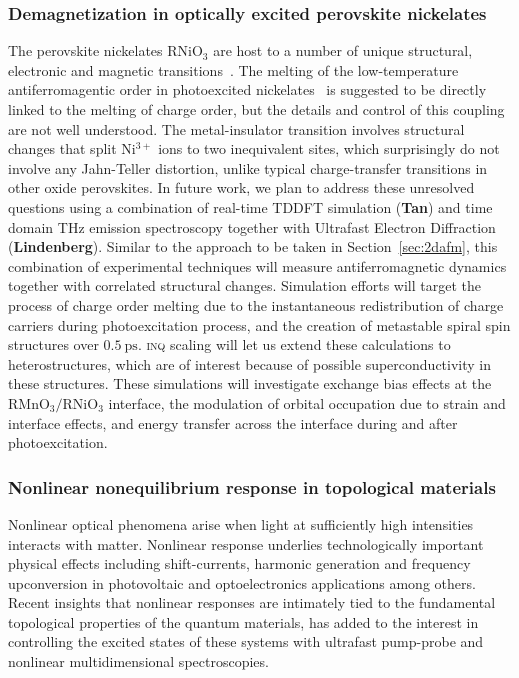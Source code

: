 \subsubsection{Demagnetization in optically excited perovskite nickelates}

The perovskite nickelates \(\mathrm{RNiO_3}\) are host to a number of unique structural, electronic and magnetic transitions~\cite{Giovannetti2009,Hampel2017,Beyerlein2018}.
The melting of the low-temperature antiferromagentic order in photoexcited nickelates~\cite{Caviglia2013} is suggested to be directly linked to the melting of charge order, but the details and control of this coupling are not well understood. 
The metal-insulator transition involves structural changes that split \(\mathrm{Ni^{3+}}\) ions to two inequivalent sites, which surprisingly do not involve any Jahn-Teller distortion, unlike typical charge-transfer transitions in other oxide perovskites. 
In future work, we plan to address these unresolved questions using a combination of real-time TDDFT simulation ({\bf Tan}) and time domain THz emission spectroscopy together with Ultrafast Electron Diffraction ({\bf Lindenberg}). 
Similar to the approach to be taken in Section~\ref{sec:2dafm}, this combination of experimental techniques will measure antiferromagnetic dynamics together with correlated structural changes. 
Simulation efforts will target the process of charge order melting due to the instantaneous redistribution of charge carriers during photoexcitation process, and the creation of metastable spiral spin structures over \(0.5~\mathrm{ps}\). 
\textsc{inq} scaling will let us extend these calculations to heterostructures, which are of interest because of possible superconductivity in these structures. These simulations will investigate exchange bias effects at the \(\mathrm{RMnO_3}/\mathrm{RNiO_3}\) interface, the modulation of orbital occupation due to strain and interface effects, and energy transfer across the interface during and after photoexcitation.

\subsubsection{Nonlinear nonequilibrium response in topological materials}

Nonlinear optical phenomena arise when light at sufficiently high intensities interacts with matter.
Nonlinear response underlies technologically important physical effects including shift-currents, harmonic generation and frequency upconversion in photovoltaic and optoelectronics applications among others.
Recent insights that nonlinear responses are intimately tied to the fundamental topological properties of the quantum materials, has added to the interest in controlling the excited states of these systems with ultrafast pump-probe and nonlinear multidimensional spectroscopies.

